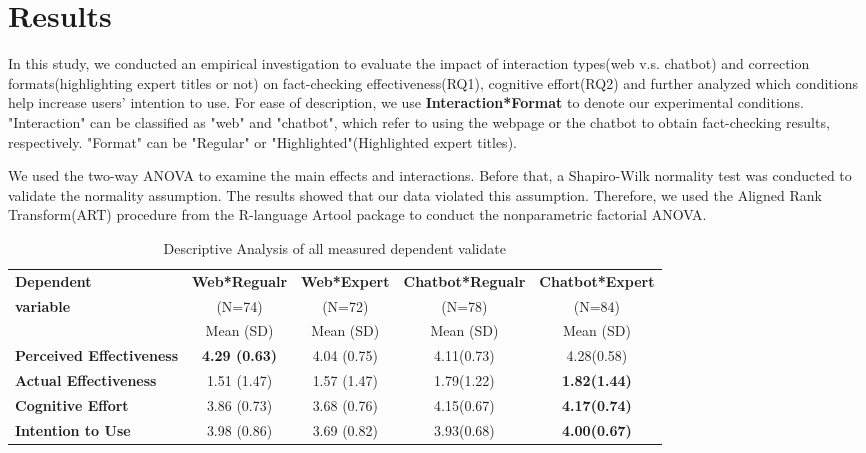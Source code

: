 \section{Results}
In this study, we conducted an empirical investigation to evaluate the impact of interaction types(web v.s. chatbot) and correction formats(highlighting expert titles or not) on fact-checking effectiveness(RQ1), cognitive effort(RQ2) and further analyzed which conditions help increase users' intention to use. 
For ease of description, we use \textbf{Interaction*Format} to denote our experimental conditions. 
"Interaction" can be classified as "web" and "chatbot", which refer to using the webpage or the chatbot to obtain fact-checking results, respectively.  
"Format" can be "Regular" or "Highlighted"(Highlighted expert titles).

We used the two-way ANOVA to examine the main effects and interactions.
Before that, a Shapiro-Wilk normality test was conducted to validate the normality assumption. The results showed that our data violated this assumption. 
Therefore, we used the Aligned Rank Transform(ART) procedure from the R-language Artool package to conduct the nonparametric factorial ANOVA.

\begin{table}[width=.9\linewidth,cols=5,pos=h]
    \caption{Descriptive Analysis of all measured dependent validate}\label{tbl1}
    \label{tab:descriptive}
    \begin{tabular*}{\tblwidth}{@{} LCCCC@{} }
    \toprule
    \textbf{Dependent}&\textbf{Web*Regualr}&\textbf{Web*Expert}&\textbf{Chatbot*Regualr} & \textbf{Chatbot*Expert}\\
    \textbf{variable}&(N=74)&(N=72)&(N=78)&(N=84)\\
     & Mean (SD) & Mean (SD) & Mean (SD) & Mean (SD) \\
    \midrule
    \textbf{Perceived Effectiveness}&\textbf{4.29 (0.63)} & 4.04 (0.75) & 4.11(0.73) & 4.28(0.58)\\
    \textbf{Actual Effectiveness}&1.51 (1.47) & 1.57 (1.47) & 1.79(1.22) & \textbf{1.82(1.44)}\\
    \textbf{Cognitive Effort}&3.86 (0.73) & 3.68 (0.76) & 4.15(0.67) & \textbf{4.17(0.74)}\\
    \textbf{Intention to Use}&3.98 (0.86) & 3.69 (0.82) & 3.93(0.68) & \textbf{4.00(0.67)}\\
    \bottomrule
    \end{tabular*}
    \end{table} 

